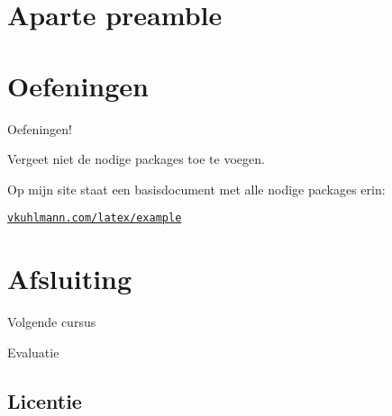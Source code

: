 \documentclass[
    dutch,
    everyoneauthor=true,
    defaultSlideCollection=vincent,
]{../../cursuspresentatie}
\let\placetarget\relax
\let\placetarget\relax
\begin{document}
\def\placetarget{\hypertarget{LaTeXDefinities}{}}


\section{Aparte preamble}

\def\placetarget{\hypertarget{apartePreamble}{}}


\section{Oefeningen}

\def\placetarget{\hypertarget{oefeningen2}{}}

\begin{frame}
    \begin{center}
        {\LARGE Oefeningen!}
        \vspace{30pt}

        Vergeet niet de nodige packages toe te voegen.
        
        Op mijn site
        staat een basisdocument met alle nodige packages erin:

        \href{https://vkuhlmann.com/latex/example}{\nolinkurl{vkuhlmann.com/latex/example}}
    \end{center}
\end{frame}





\section{Afsluiting}

\begin{frame}
    Volgende cursus
\end{frame}

\begin{frame}
    Evaluatie
\end{frame}

\subsection{Licentie}
    
\end{document}
